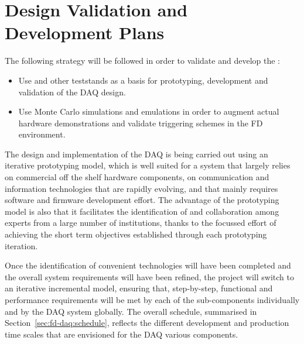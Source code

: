 \section{Design Validation and Development Plans}
\label{sec:fd-daq:validation}

The following strategy will be followed in order to validate and
develop the   :
\begin{itemize}
\item Use  and other teststands as a basis for prototyping, development and validation
of the DAQ design.
\item Use Monte Carlo simulations and emulations in order to augment actual hardware
demonstrations and validate triggering schemes in the FD environment.
\end{itemize}


The design and implementation of the DAQ is being carried out using an iterative prototyping model, which is well suited for a system that largely relies on commercial off the shelf hardware components, on communication and information technologies that are rapidly evolving, and that mainly requires software and firmware development effort.
The advantage of the prototyping model is also that it facilitates the identification of and collaboration among experts from a large number of institutions, thanks to the focussed effort of achieving the short term objectives established through each prototyping iteration.

Once the identification of convenient technologies will have been completed and the overall system requirements will have been refined, the project will switch to an iterative incremental model, ensuring that, step-by-step, functional and performance requirements will be met by each of the sub-components individually and by the DAQ system globally.
The overall schedule, summarised in Section~\ref{sec:fd-daq:schedule}, reflects the different development and production time scales that are envisioned for the DAQ various components.


